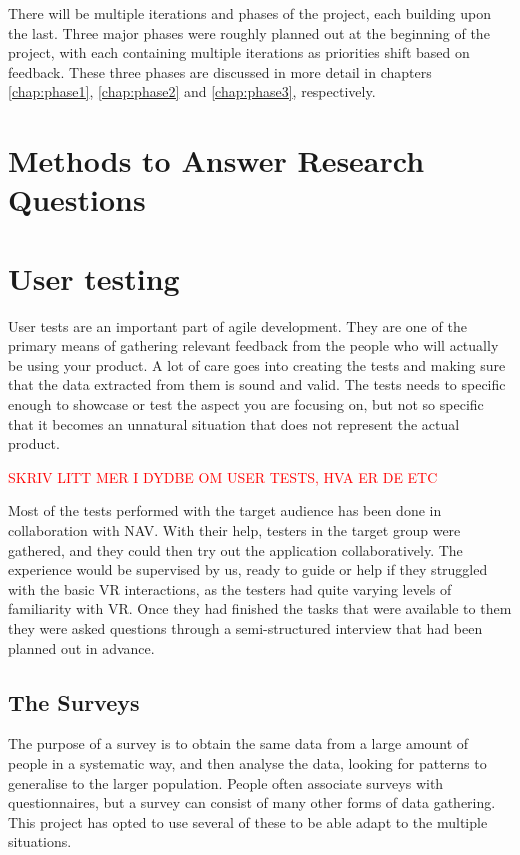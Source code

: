 There will be multiple iterations and phases of the project, each building upon the last. Three major phases were roughly planned out at the beginning of the project, with each containing multiple iterations as priorities shift based on feedback. These three phases are discussed in more detail in chapters \ref{chap:phase1}, \ref{chap:phase2} and \ref{chap:phase3}, respectively.


\section{Methods to Answer Research Questions}


\section{User testing}
User tests are an important part of agile development. They are one of the primary means of gathering relevant feedback from the people who will actually be using your product. A lot of care goes into creating the tests and making sure that the data extracted from them is sound and valid. The tests needs to specific enough to showcase or test the aspect you are focusing on, but not so specific that it becomes an unnatural situation that does not represent the actual product.

\textcolor{red}{SKRIV LITT MER I DYDBE OM USER TESTS, HVA ER DE ETC}

Most of the tests performed with the target audience has been done in collaboration with NAV. With their help, testers in the target group were gathered, and they could then try out the application collaboratively. The experience would be supervised by us, ready to guide or help if they struggled with the basic VR interactions, as the testers had quite varying levels of familiarity with VR. Once they had finished the tasks that were available to them they were asked questions through a semi-structured interview that had been planned out in advance.


\subsection{The Surveys}
The purpose of a survey is to obtain the same data from a large amount of people in a systematic way, and then analyse the data, looking for patterns to generalise to the larger population\cite{oates2005researching}. People often associate surveys with questionnaires, but a survey can consist of many other forms of data gathering. This project has opted to use several of these to be able adapt to the multiple situations. 

